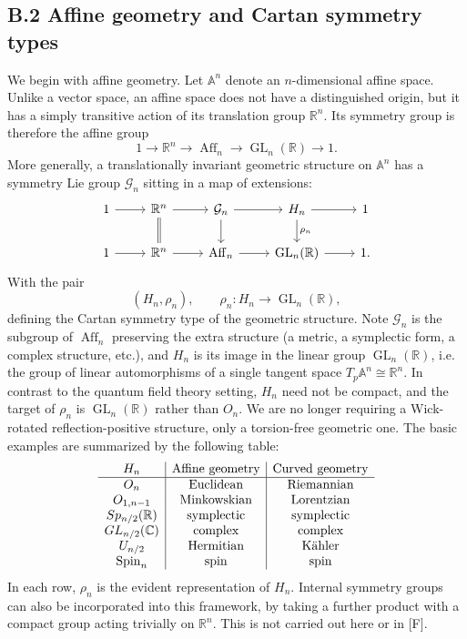 \documentclass[a4paper,11pt]{article}
\begin{document}
\begin{appendices}
\subsection*{B.2 Affine geometry and Cartan symmetry types}

We begin with affine geometry. Let $\mathbb{A}^n$ denote an $n$-dimensional
affine space. Unlike a vector space, an affine space does not have a
distinguished origin, but it has a simply transitive action of its
translation group $\mathbb{R}^n$. Its symmetry group is therefore the affine
group
\[
1 \longrightarrow \mathbb{R}^n
\longrightarrow \operatorname{Aff}_n
\longrightarrow \operatorname{GL}_n(\mathbb{R})
\longrightarrow 1.
\]
More generally, a translationally invariant geometric structure on
$\mathbb{A}^n$ has a symmetry Lie group $\mathcal G_n$ sitting in a map of extensions:
\[
\begin{tikzcd}
1 \arrow[r] &
\mathbb{R}^n \arrow[r] \arrow[d, equal] &
\mathcal{G}_n \arrow[r] \arrow[d] &
H_n \arrow[r] \arrow[d, "\rho_n"] &
1 \\
1 \arrow[r] &
\mathbb{R}^n \arrow[r] &
\operatorname{Aff}_n \arrow[r] &
\operatorname{GL}_n(\mathbb{R}) \arrow[r] &
1.
\end{tikzcd}
\]
With the pair
\[
(H_n,\rho_n), \qquad
\rho_n:H_n\longrightarrow \operatorname{GL}_n(\mathbb{R}),
\]
defining the Cartan symmetry type of the geometric structure. Note $\mathcal G_n$ is the subgroup of $\operatorname{Aff}_n$ preserving the
extra structure (a metric, a symplectic form, a complex structure, etc.), and $H_n$ is its image in the linear group $\operatorname{GL}_n(\mathbb{R})$, i.e. the group of linear automorphisms of a single tangent
space $T_p\mathbb{A}^n\cong\mathbb{R}^n$. In contrast to the quantum field theory setting, $H_n$ need not be compact, and the target of $\rho_n$ is $\operatorname{GL}_n(\mathbb{R})$ rather than $O_n$. We are no
longer requiring a Wick-rotated reflection-positive structure, only a
torsion-free geometric one. The basic examples are summarized by the following table:
\[
\begin{array}{c|c|c}
H_n & \text{Affine geometry} & \text{Curved geometry} \\ \hline
O_n & \text{Euclidean} & \text{Riemannian} \\
O_{1,n-1} & \text{Minkowskian} & \text{Lorentzian} \\
Sp_{n/2}(\mathbb{R}) & \text{symplectic} & \text{symplectic} \\
GL_{n/2}(\mathbb{C}) & \text{complex} & \text{complex} \\
U_{n/2} & \text{Hermitian} & \text{Kähler} \\
{\rm Spin}_n & \text{spin} & \text{spin}
\end{array}
\]
In each row, $\rho_n$ is the evident representation of $H_n$. Internal symmetry groups can also be incorporated into this framework, by taking a further product with a compact group acting trivially on $\mathbb{R}^n$. This is not carried out here or in [F]. 


\end{appendices}
\end{document}
